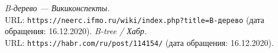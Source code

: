 \begin{thebibliography}{99}
{\itshape B-дерево — Викиконспекты.} \\URL: \texttt{https://neerc.ifmo.ru/wiki/index.php?title=B-дерево} (дата обращения: 16.12.2020).
{\itshape B-tree / Хабр.} \\URL: \texttt{https://habr.com/ru/post/114154/} (дата обращения: 16.12.2020).
\end{thebibliography}
\pagebreak


